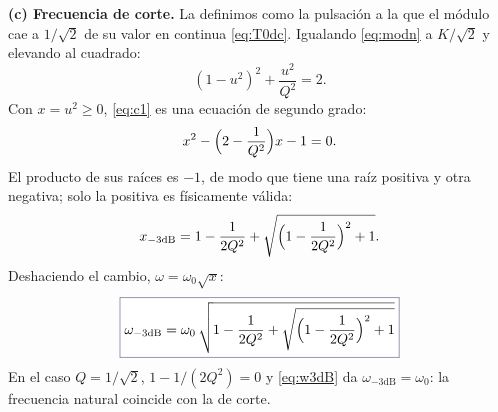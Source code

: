 \begin{resolucion}
\textbf{(c) Frecuencia de corte.} La definimos como la pulsación a la que el módulo cae a $1/\sqrt2$ de su
valor en continua \eqref{eq:T0dc}. Igualando \eqref{eq:modn} a $K/\sqrt2$ y elevando al cuadrado:
\begin{equation}\label{eq:c1}
  (1-u^{2})^{2}+\frac{u^{2}}{Q^{2}}=2 .
\end{equation}
Con $x=u^{2}\ge0$, \eqref{eq:c1} es una ecuación de segundo grado:
\begin{equation}\label{eq:c2}
  x^{2}-\Bigl(2-\frac{1}{Q^{2}}\Bigr)x-1=0 .
\end{equation}
El producto de sus raíces es $-1$, de modo que tiene una raíz positiva y otra negativa; solo la positiva es
físicamente válida:
\begin{equation}\label{eq:c3}
  x_{-3\mathrm{dB}}=1-\frac{1}{2Q^{2}}+\sqrt{\Bigl(1-\frac{1}{2Q^{2}}\Bigr)^{2}+1} .
\end{equation}
Deshaciendo el cambio, $\omega=\omega_0\sqrt{x}$:
\begin{equation}\label{eq:w3dB}
  \resultado{\omega_{-3\mathrm{dB}}=\omega_0\,\sqrt{1-\frac{1}{2Q^{2}}+\sqrt{\Bigl(1-\frac{1}{2Q^{2}}\Bigr)^{2}+1}}}
\end{equation}
En el caso $Q=1/\sqrt2$, $1-1/(2Q^{2})=0$ y \eqref{eq:w3dB} da $\omega_{-3\mathrm{dB}}=\omega_0$: la frecuencia
natural coincide con la de corte.


\end{resolucion}
